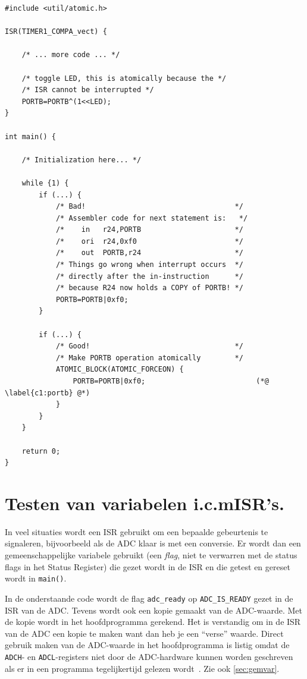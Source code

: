 \documentclass[12pt,a4paper,final,twoside,fleqn]{article}
\def\lstC{\lstinline[style=C]}
\def\lstAVR{\lstinline[style=AVR]}
\begin{document}
\begin{lstlisting}[style=C,caption=Afschermen van gemeenschappelijke variabelen]
#include <util/atomic.h>

ISR(TIMER1_COMPA_vect) {

	/* ... more code ... */
	
	/* toggle LED, this is atomically because the */
	/* ISR cannot be interrupted */
	PORTB=PORTB^(1<<LED);
}

int main() {

	/* Initialization here... */
	
	while {1) {
		if (...) {
			/* Bad!                                   */
			/* Assembler code for next statement is:   */
			/*    in   r24,PORTB                      */
			/*    ori  r24,0xf0                       */
			/*    out  PORTB,r24                      */
			/* Things go wrong when interrupt occurs  */
			/* directly after the in-instruction      */
			/* because R24 now holds a COPY of PORTB! */
			PORTB=PORTB|0xf0;
		}

		if (...) {
			/* Good!                                  */
			/* Make PORTB operation atomically        */
			ATOMIC_BLOCK(ATOMIC_FORCEON) {
				PORTB=PORTB|0xf0;                          (*@ \label{c1:portb} @*)
			}
		}
	}		

	return 0;
}
\end{lstlisting}


\section{Testen van variabelen i.c.m\@ ISR's.}
\label{sec:atomair}

In veel situaties wordt een ISR gebruikt om een bepaalde gebeurtenis te signaleren,
bijvoorbeeld als de ADC klaar is met een conversie. Er wordt dan een gemeenschappelijke
variabele gebruikt (een \emph{flag}, niet te verwarren met de status flags in het Status
Register) die gezet wordt in de ISR en die getest en gereset wordt in \lstC{main()}.

In de onderstaande code wordt de flag \lstC{adc_ready} op \lstC{ADC_IS_READY} gezet in de
ISR van de ADC.
Tevens wordt ook een kopie gemaakt van de ADC-waarde. Met de kopie wordt in het hoofdprogramma
gerekend. Het is verstandig om in de ISR van de ADC een kopie te maken want dan heb je
een ``verse'' waarde. Direct gebruik maken van de ADC-waarde in het hoofdprogramma is
listig omdat de \lstAVR|ADCH|- en \lstAVR|ADCL|-registers niet door de ADC-hardware kunnen
worden geschreven als er in een programma tegelijkertijd gelezen wordt~\cite{atmega32doc8155G}.
Zie ook \ref{sec:gemvar}.
\end{document}
